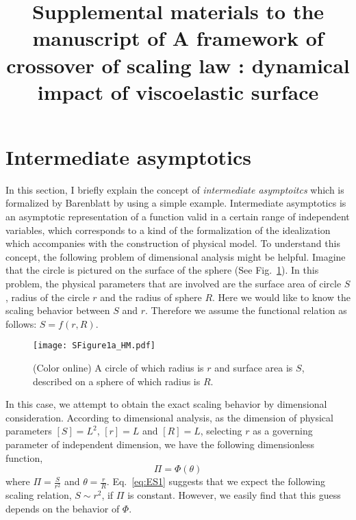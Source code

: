 \documentclass[aps,prl,superscriptaddress]{revtex4}  %
\begin{document}
\title{Supplemental materials to the manuscript of A framework of crossover of scaling law : dynamical impact of viscoelastic surface}
\maketitle

\section{Intermediate asymptotics}

In this section, I briefly explain the concept of {\it intermediate asymptoitcs} which is formalized by Barenblatt\cite{Barenblatt2003,Barenblatt1996, Barenblatt2014,Barenblatt1972} by using a simple example. Intermediate asymptotics is an asymptotic representation of a function valid in a certain range of independent variables, which corresponds to a kind of the formalization of the idealization which accompanies with the construction of physical model. To understand this concept, the following problem of dimensional analysis might be helpful. Imagine that the circle is pictured on the surface of the sphere (See Fig.~\ref{fig:FS1a}). In this problem, the physical parameters that are involved are the surface area of circle $S$, radius of the circle $r$ and the radius of sphere $R$. Here we would like to know the scaling behavior between $S$ and $r$. Therefore we assume the functional relation as follows: $S = f(r, R)$. 

%
\begin{figure}[h!]
\texttt{[image: SFigure1a\_HM.pdf]}
\caption{(Color online) A circle of which radius is $r$ and surface area is $S$, described on a sphere of which radius is $R$.  \label{fig:FS1a}  }
\end{figure}
%
In this case, we attempt to obtain the exact scaling behavior by dimensional consideration. According to dimensional analysis, as the dimension of physical parameters $[S]=L^2$, $[r]=L$ and $[R]=L$, selecting $r$ as a governing parameter of independent dimension, we have the following dimensionless function,
%
\begin{equation}
\Pi = \Phi \left( \theta \right)
\label{eq:ES1}
\end{equation}
%
where $\Pi = \frac{S}{r^2}$ and $\theta = \frac{r}{R}$. Eq.~\ref{eq:ES1} suggests that we expect the following scaling relation, $S \sim r^2$, if $\Pi$ is constant. However, we easily find that this guess depends on the behavior of $\Phi$. 
\end{document}
